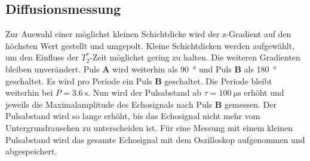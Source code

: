 
\subsection{Diffusionsmessung}
Zur Auswahl einer möglichst kleinen Schichtdicke wird der z-Gradient auf den höchsten Wert gestellt und umgepolt.
Kleine Schichtdicken werden aufgewählt, um den Einfluss der $T_2^*$-Zeit möglichst gering zu halten.
Die weiteren Gradienten bleiben unverändert.
Puls \textbf{A} wird weiterhin als \SI{90}{\degree} und Puls \textbf{B} als \SI{180}{\degree} geschaltet.
Es wird pro Periode ein Puls \textbf{B} geschaltet.
Die Periode bleibt weiterhin bei $P = \SI{3.6}{\second}$.
Nun wird der Pulsabstand ab $\tau = \SI{100}{\micro\second}$ erhöht und jeweils die Maximalamplitude des Echosignals nach Puls \textbf{B} gemessen.
Der Pulsabstand wird so lange erhöht, bis das Echosignal nicht mehr vom Untergrundrauschen zu unterscheiden ist.
Für eine Messung mit einem kleinen Pulsabstand wird das gesamte Echosignal mit dem Oszilloskop aufgenommen und abgespeichert.
